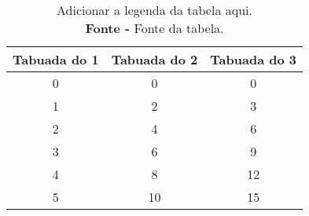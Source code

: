 \begin{table}[H]
    \centering
    \begin{tabular}{c c c} 
        \toprule
        \textbf{Tabuada do 1} & \textbf{Tabuada do 2} & \textbf{Tabuada do 3} \\ [0.5ex] 
        \midrule
        0 & 0 & 0 \\
        \hline
        1 & 2 & 3 \\
        \hline
        2 & 4 & 6 \\
        \hline
        3 & 6 & 9 \\
        \hline
        4 & 8 & 12 \\
        \hline
        5 & 10 & 15 \\
        \bottomrule
    \end{tabular}
    \caption{\label{tabela_tabuadas}Adicionar a legenda da tabela aqui. \\ \textbf{Fonte -} Fonte da tabela.}
\end{table}

%
%
%
%
